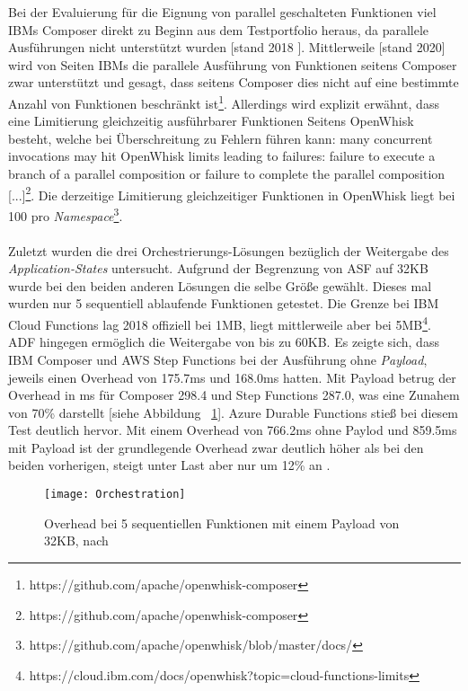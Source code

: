 Bei der Evaluierung für die Eignung von parallel geschalteten Funktionen viel IBMs Composer direkt zu Beginn aus dem Testportfolio heraus, da parallele Ausführungen nicht unterstützt wurden [stand 2018 \cite{lopez2018comparison}]. Mittlerweile [stand 2020] wird von Seiten IBMs die parallele Ausführung von Funktionen seitens Composer zwar unterstützt und gesagt, dass seitens Composer dies nicht auf eine bestimmte Anzahl von Funktionen beschränkt ist\footnote{https://github.com/apache/openwhisk-composer}. Allerdings wird explizit erwähnt, dass eine Limitierung gleichzeitig ausführbarer Funktionen Seitens OpenWhisk besteht, welche bei Überschreitung zu Fehlern führen kann: \glqq [...] many concurrent invocations may hit OpenWhisk limits leading to failures: failure to execute a branch of a parallel composition or failure to complete the parallel composition [...]\grqq{}\footnote{https://github.com/apache/openwhisk-composer}. Die derzeitige Limitierung gleichzeitiger Funktionen in OpenWhisk liegt bei 100 pro \textit{Namespace}\footnote{https://github.com/apache/openwhisk/blob/master/docs/}.\\\\
Zuletzt wurden die drei Orchestrierungs-Lösungen bezüglich der Weitergabe des \textit{Application-States} untersucht. Aufgrund der Begrenzung von ASF auf 32KB wurde bei den beiden anderen Lösungen die selbe Größe gewählt. Dieses mal wurden nur 5 sequentiell ablaufende Funktionen getestet. Die Grenze bei IBM Cloud Functions lag 2018 offiziell bei 1MB, liegt mittlerweile aber bei 5MB\footnote{https://cloud.ibm.com/docs/openwhisk?topic=cloud-functions-limits}. ADF hingegen ermöglich die Weitergabe von bis zu 60KB. Es zeigte sich, dass IBM Composer und AWS Step Functions bei der Ausführung ohne \textit{Payload}, jeweils einen Overhead von 175.7ms und 168.0ms hatten. Mit Payload betrug der Overhead in ms für Composer 298.4 und Step Functions 287.0, was eine Zunahem von 70\% darstellt [siehe Abbildung ~\ref{fig:orchestration}]. Azure Durable Functions stieß bei diesem Test deutlich hervor. Mit einem Overhead von 766.2ms ohne Paylod und 859.5ms mit Payload ist der grundlegende Overhead zwar deutlich höher als bei den beiden vorherigen, steigt unter Last aber nur um 12\% an \cite{lopez2018comparison}.
\begin{figure}[H]
    \caption{Overhead bei 5 sequentiellen Funktionen mit einem Payload von 32KB, nach \cite{lopez2018comparison}}
    \label{fig:orchestration}
    \centering
    \texttt{[image: Orchestration]}
    \end{figure} 

